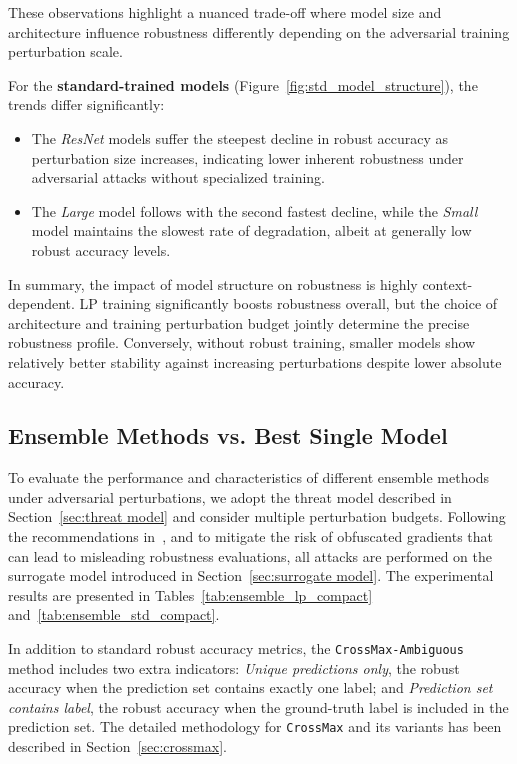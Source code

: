 These observations highlight a nuanced trade-off where model size and architecture influence robustness differently depending on the adversarial training perturbation scale.

For the \textbf{standard-trained models} (Figure~\ref{fig:std_model_structure}), the trends differ significantly:

\begin{itemize}
    \item The \textit{ResNet} models suffer the steepest decline in robust accuracy as perturbation size increases, indicating lower inherent robustness under adversarial attacks without specialized training.
    \item The \textit{Large} model follows with the second fastest decline, while the \textit{Small} model maintains the slowest rate of degradation, albeit at generally low robust accuracy levels.
\end{itemize}

In summary, the impact of model structure on robustness is highly context-dependent. LP training significantly boosts robustness overall, but the choice of architecture and training perturbation budget jointly determine the precise robustness profile. Conversely, without robust training, smaller models show relatively better stability against increasing perturbations despite lower absolute accuracy.






\subsection{Ensemble Methods vs. Best Single Model}
\indent

To evaluate the performance and characteristics of different ensemble methods under adversarial perturbations, we adopt the threat model described in Section~\ref{sec:threat model} and consider multiple perturbation budgets. 
Following the recommendations in~\cite{zhang2024evaluating}, and to mitigate the risk of obfuscated gradients that can lead to misleading robustness evaluations, all attacks are performed on the surrogate model introduced in Section~\ref{sec:surrogate model}.
The experimental results are presented in Tables~\ref{tab:ensemble_lp_compact} and~\ref{tab:ensemble_std_compact}.


In addition to standard robust accuracy metrics, the \texttt{CrossMax-Ambiguous} method includes two extra indicators: 
\emph{Unique predictions only}, the robust accuracy when the prediction set contains exactly one label; 
and \emph{Prediction set contains label}, the robust accuracy when the ground-truth label is included in the prediction set. 
The detailed methodology for \texttt{CrossMax} and its variants has been described in Section~\ref{sec:crossmax}.


